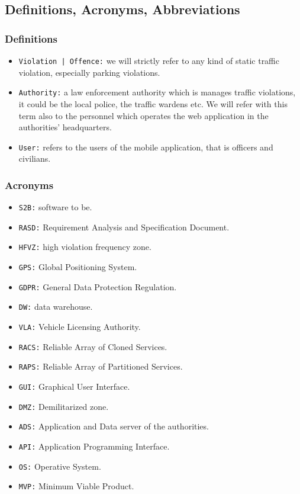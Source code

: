 \documentclass[12pt,a4paper]{article}
\begin{document}
\subsection{Definitions, Acronyms, Abbreviations}
\subsubsection{Definitions}
\begin{itemize}
\item \texttt{Violation | Offence:} we will strictly refer to any kind of static traffic violation, especially parking violations. 
\item \texttt{Authority:} a law enforcement authority which is manages traffic violations, it could be the local police, the traffic wardens etc. We will refer with this term also to the personnel which operates the web application in the authorities' headquarters.
\item \texttt{User:} refers to the users of the mobile application, that is officers and civilians.
\end{itemize}
\subsubsection{Acronyms}
\begin{itemize}
\item \texttt{S2B:} software to be.
\item \texttt{RASD:} Requirement Analysis and Specification Document.
\item \texttt{HFVZ:} high violation frequency zone.
\item \texttt{GPS:} Global Positioning System.
\item \texttt{GDPR:} General Data Protection Regulation.
\item \texttt{DW:} data warehouse.
\item \texttt{VLA:} Vehicle Licensing Authority.
\item \texttt{RACS:} Reliable Array of Cloned Services.
\item \texttt{RAPS:} Reliable Array of Partitioned Services.
\item \texttt{GUI:} Graphical User Interface.
\item \texttt{DMZ:} Demilitarized zone.
\item \texttt{ADS:} Application and Data server of the authorities.
\item \texttt{API:} Application Programming Interface.
\item \texttt{OS:} Operative System.
\item \texttt{MVP:} Minimum Viable Product.
\end{itemize}
\end{document}
